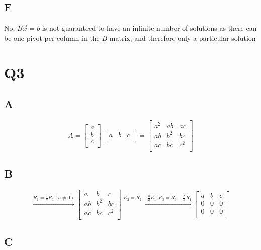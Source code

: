 \documentclass{report}
\begin{document}
\subsection*{F}

No, \(B \vec{x} = b\) is not guaranteed to have an infinite number of solutions as there can be one pivot per column in the \(B\) matrix, and therefore only a particular solution

\section*{Q3}

\subsection*{A}

\[
	A=
	\begin{bmatrix}
		a \\b\\c\\
	\end{bmatrix}
	\begin{bmatrix}
		a & b & c \\
	\end{bmatrix}
	=
	\begin{bmatrix}
		a^2 & ab  & ac  \\
		ab  & b^2 & bc  \\
		ac  & bc  & c^2 \\
	\end{bmatrix}
\]

\subsection*{B}

\[
	\xrightarrow{
		R_1 = \frac{1}{a}R_1 (a \neq 0)
	}
	\begin{bmatrix}
		a  & b   & c   \\
		ab & b^2 & bc  \\
		ac & bc  & c^2 \\
	\end{bmatrix}
	\xrightarrow{R_2 = R_2 - \frac{b}{a}R_1, R_3 = R_3 - \frac{c}{a}R_1}
	\begin{bmatrix}
		a & b & c \\
		0 & 0 & 0 \\
		0 & 0 & 0 \\
	\end{bmatrix}
\]

\subsection*{C}
\end{document}
